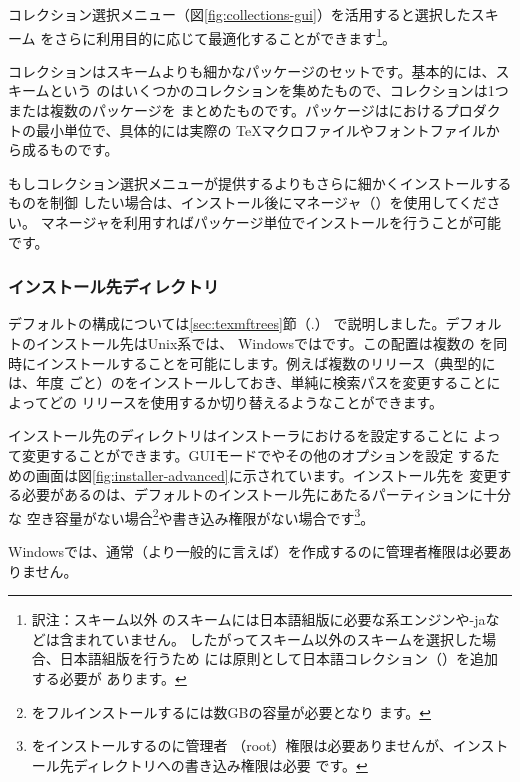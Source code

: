 \documentclass[uplatex,dvipdfmx,12pt,tombow]{jsarticle}
\begin{document}
コレクション選択メニュー（図\ref{fig:collections-gui}）を活用すると選択したスキーム
をさらに利用目的に応じて最適化することができます\footnote{訳注：スキーム以外
のスキームには日本語組版に必要な\pTeX 系エンジンや\LuaTeX-jaなどは含まれていません。
したがってスキーム以外のスキームを選択した場合、日本語組版を行うため
には原則として日本語コレクション（）を追加する必要が
あります。}。

コレクションはスキームよりも細かなパッケージのセットです。基本的には、スキームという
のはいくつかのコレクションを集めたもので、コレクションは1つまたは複数のパッケージを
まとめたものです。パッケージは\TL におけるプロダクトの最小単位で、具体的には実際の
\TeX マクロファイルやフォントファイルから成るものです。

もしコレクション選択メニューが提供するよりもさらに細かくインストールするものを制御
したい場合は、インストール後に\TL マネージャ（）を使用してください。
\TL マネージャを利用すればパッケージ単位でインストールを行うことが可能です。

\subsubsection{インストール先ディレクトリ}
\label{sec:directories}

デフォルトの\TL 構成については\ref{sec:texmftrees}節（\p.\pageref{sec:texmftrees}）
で説明しました。デフォルトのインストール先はUnix系では、
Windowsではです。この配置は複数の\TL
を同時にインストールすることを可能にします。例えば複数のリリース（典型的には、年度
ごと）の\TL をインストールしておき、単純に検索パスを変更することによってどの
リリースを使用するか切り替えるようなことができます。

インストール先のディレクトリはインストーラにおけるを設定することに
よって変更することができます。GUIモードでやその他のオプションを設定
するための画面は図\ref{fig:installer-advanced}に示されています。インストール先を
変更する必要があるのは、デフォルトのインストール先にあたるパーティションに十分な
空き容量がない場合\footnote{\TL をフルインストールするには数GBの容量が必要となり
ます。}や書き込み権限がない場合です\footnote{\TL をインストールするのに管理者
（root）権限は必要ありませんが、インストール先ディレクトリへの書き込み権限は必要
です。}。

Windowsでは、通常（より一般的に言えば）を作成するのに管理者権限は必要ありません。
\end{document}
